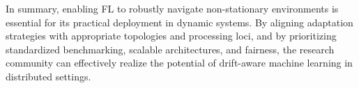 \documentclass[journal]{IEEEtran}
\begin{document}
In summary, enabling FL to robustly navigate non-stationary environments is essential for its practical deployment in dynamic systems. By aligning adaptation strategies with appropriate topologies and processing loci, and by prioritizing standardized benchmarking, scalable architectures, and fairness, the research community can effectively realize the potential of drift-aware machine learning in distributed settings.



\end{document}
